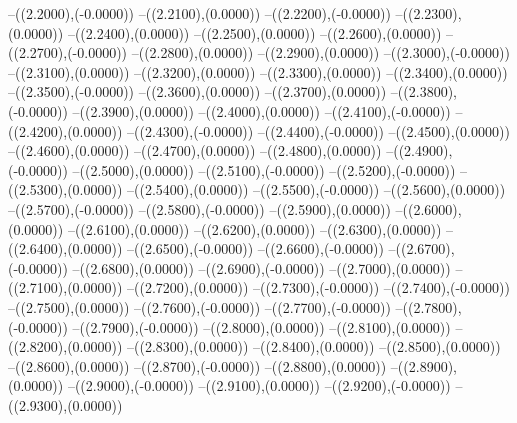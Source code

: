 {	--({\sx*(2.2000)},{\sy*(-0.0000)})
	--({\sx*(2.2100)},{\sy*(0.0000)})
	--({\sx*(2.2200)},{\sy*(-0.0000)})
	--({\sx*(2.2300)},{\sy*(0.0000)})
	--({\sx*(2.2400)},{\sy*(0.0000)})
	--({\sx*(2.2500)},{\sy*(0.0000)})
	--({\sx*(2.2600)},{\sy*(0.0000)})
	--({\sx*(2.2700)},{\sy*(-0.0000)})
	--({\sx*(2.2800)},{\sy*(0.0000)})
	--({\sx*(2.2900)},{\sy*(0.0000)})
	--({\sx*(2.3000)},{\sy*(-0.0000)})
	--({\sx*(2.3100)},{\sy*(0.0000)})
	--({\sx*(2.3200)},{\sy*(0.0000)})
	--({\sx*(2.3300)},{\sy*(0.0000)})
	--({\sx*(2.3400)},{\sy*(0.0000)})
	--({\sx*(2.3500)},{\sy*(-0.0000)})
	--({\sx*(2.3600)},{\sy*(0.0000)})
	--({\sx*(2.3700)},{\sy*(0.0000)})
	--({\sx*(2.3800)},{\sy*(-0.0000)})
	--({\sx*(2.3900)},{\sy*(0.0000)})
	--({\sx*(2.4000)},{\sy*(0.0000)})
	--({\sx*(2.4100)},{\sy*(-0.0000)})
	--({\sx*(2.4200)},{\sy*(0.0000)})
	--({\sx*(2.4300)},{\sy*(-0.0000)})
	--({\sx*(2.4400)},{\sy*(-0.0000)})
	--({\sx*(2.4500)},{\sy*(0.0000)})
	--({\sx*(2.4600)},{\sy*(0.0000)})
	--({\sx*(2.4700)},{\sy*(0.0000)})
	--({\sx*(2.4800)},{\sy*(0.0000)})
	--({\sx*(2.4900)},{\sy*(-0.0000)})
	--({\sx*(2.5000)},{\sy*(0.0000)})
	--({\sx*(2.5100)},{\sy*(-0.0000)})
	--({\sx*(2.5200)},{\sy*(-0.0000)})
	--({\sx*(2.5300)},{\sy*(0.0000)})
	--({\sx*(2.5400)},{\sy*(0.0000)})
	--({\sx*(2.5500)},{\sy*(-0.0000)})
	--({\sx*(2.5600)},{\sy*(0.0000)})
	--({\sx*(2.5700)},{\sy*(-0.0000)})
	--({\sx*(2.5800)},{\sy*(-0.0000)})
	--({\sx*(2.5900)},{\sy*(0.0000)})
	--({\sx*(2.6000)},{\sy*(0.0000)})
	--({\sx*(2.6100)},{\sy*(0.0000)})
	--({\sx*(2.6200)},{\sy*(0.0000)})
	--({\sx*(2.6300)},{\sy*(0.0000)})
	--({\sx*(2.6400)},{\sy*(0.0000)})
	--({\sx*(2.6500)},{\sy*(-0.0000)})
	--({\sx*(2.6600)},{\sy*(-0.0000)})
	--({\sx*(2.6700)},{\sy*(-0.0000)})
	--({\sx*(2.6800)},{\sy*(0.0000)})
	--({\sx*(2.6900)},{\sy*(-0.0000)})
	--({\sx*(2.7000)},{\sy*(0.0000)})
	--({\sx*(2.7100)},{\sy*(0.0000)})
	--({\sx*(2.7200)},{\sy*(0.0000)})
	--({\sx*(2.7300)},{\sy*(-0.0000)})
	--({\sx*(2.7400)},{\sy*(-0.0000)})
	--({\sx*(2.7500)},{\sy*(0.0000)})
	--({\sx*(2.7600)},{\sy*(-0.0000)})
	--({\sx*(2.7700)},{\sy*(-0.0000)})
	--({\sx*(2.7800)},{\sy*(-0.0000)})
	--({\sx*(2.7900)},{\sy*(-0.0000)})
	--({\sx*(2.8000)},{\sy*(0.0000)})
	--({\sx*(2.8100)},{\sy*(0.0000)})
	--({\sx*(2.8200)},{\sy*(0.0000)})
	--({\sx*(2.8300)},{\sy*(0.0000)})
	--({\sx*(2.8400)},{\sy*(0.0000)})
	--({\sx*(2.8500)},{\sy*(0.0000)})
	--({\sx*(2.8600)},{\sy*(0.0000)})
	--({\sx*(2.8700)},{\sy*(-0.0000)})
	--({\sx*(2.8800)},{\sy*(0.0000)})
	--({\sx*(2.8900)},{\sy*(0.0000)})
	--({\sx*(2.9000)},{\sy*(-0.0000)})
	--({\sx*(2.9100)},{\sy*(0.0000)})
	--({\sx*(2.9200)},{\sy*(-0.0000)})
	--({\sx*(2.9300)},{\sy*(0.0000)})
}
